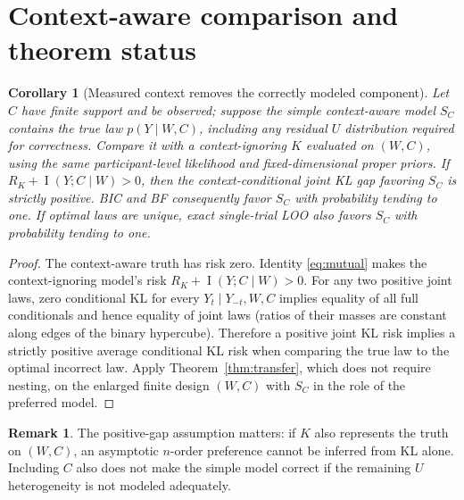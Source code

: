 \documentclass[11pt,letterpaper]{article}
\theoremstyle{plain}
\newtheorem{corollary}[theorem]{Corollary}
\theoremstyle{definition}
\newtheorem{remark}[theorem]{Remark}
\newcommand{\IP}{\operatorname{I}}
\begin{document}
\section{Context-aware comparison and theorem status}
\begin{corollary}[Measured context removes the correctly modeled component]\label{cor:ctx}
Let $C$ have finite support and be observed; suppose the simple context-aware model $S_C$ contains the true law $p(Y\mid W,C)$, including any residual $U$ distribution required for correctness. Compare it with a context-ignoring $K$ evaluated on $(W,C)$, using the same participant-level likelihood and fixed-dimensional proper priors. If $R_K+\IP(Y;C\mid W)>0$, then the \emph{context-conditional} joint KL gap favoring $S_C$ is strictly positive. BIC and BF consequently favor $S_C$ with probability tending to one. If optimal laws are unique, exact single-trial LOO also favors $S_C$ with probability tending to one.
\end{corollary}
\begin{proof}
The context-aware truth has risk zero. Identity \eqref{eq:mutual} makes the context-ignoring model's risk $R_K+\IP(Y;C\mid W)>0$. For any two positive joint laws, zero conditional KL for every $Y_t\mid Y_{-t},W,C$ implies equality of all full conditionals and hence equality of joint laws (ratios of their masses are constant along edges of the binary hypercube). Therefore a positive joint KL risk implies a strictly positive average conditional KL risk when comparing the true law to the optimal incorrect law. Apply Theorem~\ref{thm:transfer}, which does not require nesting, on the enlarged finite design $(W,C)$ with $S_C$ in the role of the preferred model.
\end{proof}
\begin{remark}
The positive-gap assumption matters: if $K$ also represents the truth on $(W,C)$, an asymptotic $n$-order preference cannot be inferred from KL alone. Including $C$ also does not make the simple model correct if the remaining $U$ heterogeneity is not modeled adequately.
\end{remark}
\end{document}
